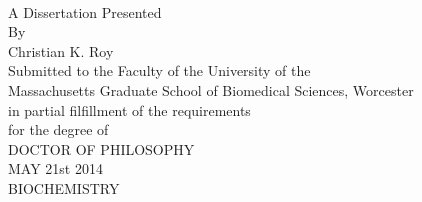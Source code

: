 \begin{titlepage}
\begin{center}
	\LARGE \ttitle \\[2cm] 
	{\large 
		A Dissertation Presented \\[1cm]
		By \\[1cm]
		Christian K. Roy \\[1cm]
		Submitted to the Faculty of the University of the \\
		Massachusetts Graduate School of Biomedical Sciences, Worcester\\
		in partial filfillment of the requirements\\
		for the degree of \\[2cm]
		DOCTOR OF PHILOSOPHY \\[1cm]
		MAY 21st 2014\\[1cm]
		BIOCHEMISTRY\\[1cm]
 	}
 \end{center}
 \end{titlepage}
